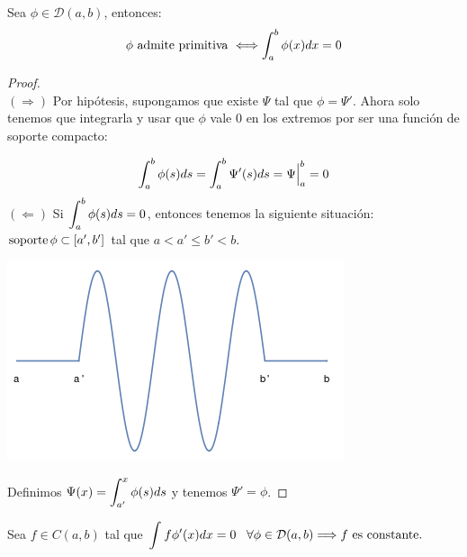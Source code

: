 \begin{lemma}
\label{lemma:13}
Sea $\phi\in\mathcal{D}(a,b)$, entonces:
\[
\phi \text{ admite primitiva } \Longleftrightarrow \displaystyle\int_{ a }^{ b } \phi(x)dx=0
\]
\end{lemma}

\begin{proof}
\hfill\\
$(\Rightarrow)$ Por hipótesis, supongamos que existe $\Psi$ tal que $\phi=\Psi'$. Ahora solo tenemos que integrarla y usar que $\phi$ vale 0 en los extremos por ser una función de soporte compacto:

\[
\displaystyle\int_{ a }^{ b } \phi(s)ds=\displaystyle\int_{ a }^{ b } \Psi'(s)ds=\Psi\Big|_a^b=0
\]
$(\Leftarrow)$  Si $\displaystyle\int_{ a }^{ b } \phi(s)ds=0$, entonces tenemos la siguiente situación: $\operatorname{soporte}\phi\subset[a',b']$ tal que $a<a'\leq b'<b$.

\begin{center}
\includegraphics[scale=0.4]{./img/testfuncion.png}
\end{center}

Definimos $\Psi(x)=\displaystyle\int_{ a' }^{ x } \phi(s)ds$ y tenemos $\Psi'=\phi$.

\end{proof}

\begin{lemma}
\label{lemma:14}
Sea $f\in C(a,b)$ tal que $\displaystyle\int_{  }^{  } f\phi'(x)dx=0\;\;\;\forall\phi\in\mathcal{D}(a,b)\Longrightarrow f \text{ es constante.}$
\end{lemma}

